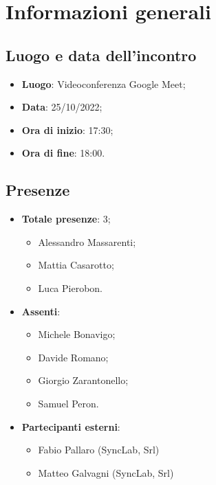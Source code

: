 \section{Informazioni generali}

\subsection{Luogo e data dell'incontro}
\begin{itemize}
    \item \textbf{Luogo}: Videoconferenza Google Meet;
    \item \textbf{Data}: 25/10/2022;
    \item \textbf{Ora di inizio}: 17:30;
    \item \textbf{Ora di fine}: 18:00.
\end{itemize}
\subsection{Presenze}
\begin{itemize}
    \item \textbf{Totale presenze}: 3;
    \begin{itemize}
        \item Alessandro Massarenti;
        \item Mattia Casarotto;
        \item Luca Pierobon.
    \end{itemize}
    \item \textbf{Assenti}:
    \begin{itemize}
        \item Michele Bonavigo;
        \item Davide Romano;
        \item Giorgio Zarantonello;
        \item Samuel Peron.
    \end{itemize}
    \item \textbf{Partecipanti esterni}:
    \begin{itemize}
        \item Fabio Pallaro (SyncLab, Srl)
        \item Matteo Galvagni (SyncLab, Srl)
    \end{itemize}
\end{itemize}